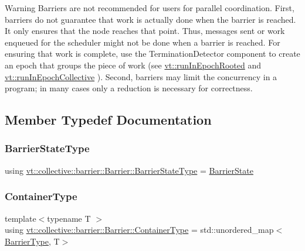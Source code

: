 \begin{DoxyWarning}{Warning}
Barriers are not recommended for users for parallel coordination. First, barriers do not guarantee that work is actually done when the barrier is reached. It only ensures that the node reaches that point. Thus, messages sent or work enqueued for the scheduler might not be done when a barrier is reached. For ensuring that work is complete, use the {\ttfamily Termination\+Detector} component to create an epoch that groups the piece of work (see {\ttfamily \hyperlink{namespacevt_a9f5cbbc484d7f14f2ad0ee46d62dfb6e}{vt\+::run\+In\+Epoch\+Rooted}} and {\ttfamily \hyperlink{namespacevt_a2fc4ef34f30b49a1781d765804bfadbb}{vt\+::run\+In\+Epoch\+Collective}} ). Second, barriers may limit the concurrency in a program; in many cases only a reduction is necessary for correctness. 
\end{DoxyWarning}


\subsection{Member Typedef Documentation}
\mbox{\label{structvt_1_1collective_1_1barrier_1_1_barrier_a9b612818f7b44ca65f2caee0dee094f3}} 
\subsubsection{\texorpdfstring{Barrier\+State\+Type}{BarrierStateType}}
{\footnotesize\ttfamily using \hyperlink{structvt_1_1collective_1_1barrier_1_1_barrier_a9b612818f7b44ca65f2caee0dee094f3}{vt\+::collective\+::barrier\+::\+Barrier\+::\+Barrier\+State\+Type} =  \hyperlink{structvt_1_1collective_1_1barrier_1_1_barrier_state}{Barrier\+State}}

\mbox{\label{structvt_1_1collective_1_1barrier_1_1_barrier_a84bfbd26a48a1c3bb7272e81245e4873}} 
\subsubsection{\texorpdfstring{Container\+Type}{ContainerType}}
{\footnotesize\ttfamily template$<$typename T $>$ \\
using \hyperlink{structvt_1_1collective_1_1barrier_1_1_barrier_a84bfbd26a48a1c3bb7272e81245e4873}{vt\+::collective\+::barrier\+::\+Barrier\+::\+Container\+Type} =  std\+::unordered\+\_\+map$<$\hyperlink{namespacevt_a25e481f0d6bbc7204db23d1c87a62e77}{Barrier\+Type}, T$>$}



